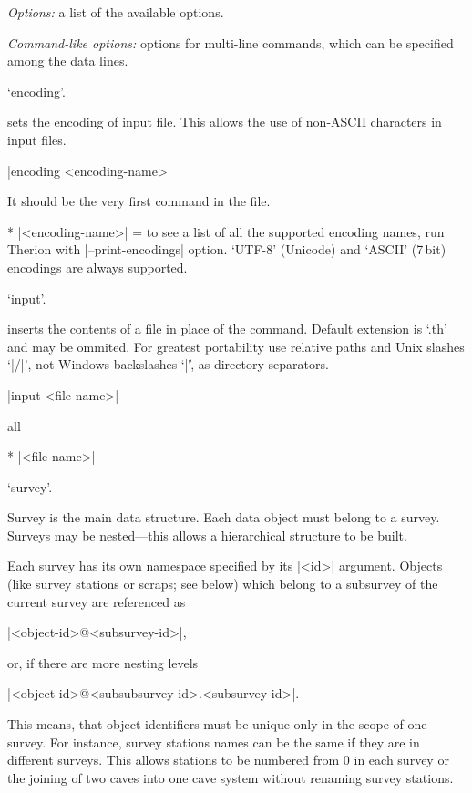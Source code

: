 {\it Options:} a list of the available options.

{\it Command-like options:} options for multi-line commands, which can be specified 
   among the data lines.



\subsubchapter `encoding'.

\description
  sets the encoding of input file. This allows the use of non-ASCII characters
  in input files.
\enddescription

\syntax
  |encoding <encoding-name>|
\endsyntax

\context
  It should be the very first command in the file.
\endcontext

\arguments
* |<encoding-name>| = to see a list of all the supported encoding names, run Therion with 
  |--print-encodings| option. `UTF-8' (Unicode) and `ASCII' (7\,bit) encodings 
  are always supported.
\endarguments



\subsubchapter `input'.

\description
  inserts the contents of a file in place of 
  the command. Default extension is `.th' and may be ommited. For greatest 
  portability use relative paths and Unix slashes `|/|', not Windows 
  backslashes `|\|', as 
  directory separators.
\enddescription

\syntax
  |input <file-name>|
\endsyntax

\context
  all
\endcontext

\arguments
*  |<file-name>|
\endarguments



\subsubchapter `survey'.

\description
  Survey is the main data structure. Each data object must belong to a 
  survey. Surveys may be nested---this allows a hierarchical structure 
  to be built. 

  Each survey has its own namespace specified by its |<id>| argument. Objects 
  (like survey stations or scraps; see below) which belong to a subsurvey of 
  the current survey are referenced as
  
  |<object-id>@<subsurvey-id>|,
  
  or, if there are more nesting levels
  
  |<object-id>@<subsubsurvey-id>.<subsurvey-id>|.
  
  This means, that object identifiers must be unique only in the scope of one 
  survey. For instance, survey stations names can be the same if they are 
  in different surveys. This allows stations to be numbered from 0 in each survey or 
  the joining of two caves into one cave system without renaming survey stations.

